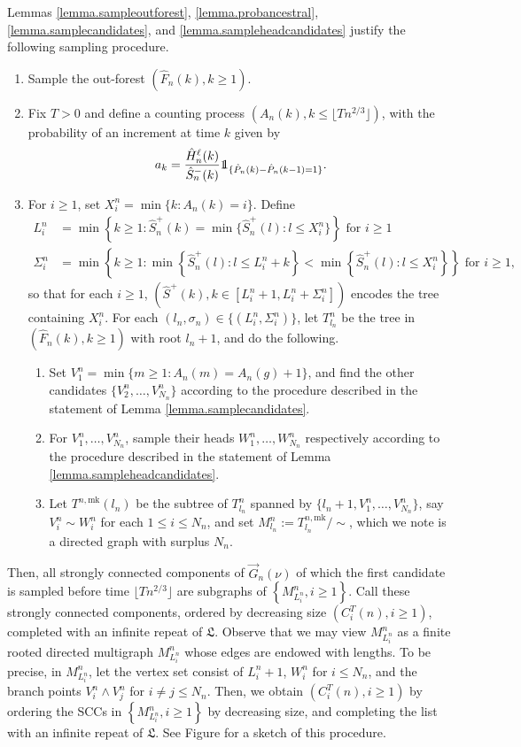 Lemmas \ref{lemma.sampleoutforest}, \ref{lemma.probancestral}, \ref{lemma.samplecandidates}, and \ref{lemma.sampleheadcandidates} justify the following sampling procedure.
\begin{enumerate}
    \item Sample the out-forest $(\hat{F}_n(k),k\geq 1)$.
    \item Fix $T>0$ and define a counting process $(A_n(k),k\leq \lfloor Tn^{2/3}\rfloor)$, with the probability of an increment at time $k$ given by $$a_k=\frac{\hat{H}_n^\ell(k)}{\hat{S}_n^-(k)}\one_{\{\hat{P}_n(k)-\hat{P}_n(k-1)=1\}}.$$
    \item For $i\geq 1$, set $X_i^n=\min\{k:A_n(k)=i\}$. Define
\begin{align*}L_i^n&=\min\left\{k\geq 1:\hat{S}^{+}_n(k)=\min\{\hat{S}^{+}_n(l):l\leq X_i^n\}\right\}\text{ for }i\geq 1\\
\Sigma_i^n&=\min\left\{k \geq 1: \min\left\{\hat{S}^{+}_n(l):l\leq L_i^n+k\right\} < \min\left\{\hat{S}^{+}_n(l):l\leq X_i^n\right\}\right\}\text{ for }i\geq 1,
\end{align*}
so that for each $i\geq 1$, $\left(\hat{S}^+(k),k\in [L_i^n+1,L_i^n+\Sigma_i^n]\right)$ encodes the tree containing $X_i^n$. For each $(l_n,\sigma_n)\in \{(L_i^n,\Sigma_i^n)\}$, let $T^n_{l_n}$ be the tree in $(\hat{F}_n(k),k\geq 1)$ with root $l_n+1$, and do the following.
    \begin{enumerate}
    \item \label{item.procedure3} Set $V_1^n=\min\{m\geq 1:A_n(m)=A_n(g)+1\}$, and find the other candidates $\{V_2^n,\dots ,V_{N_n}^n\}$ according to the procedure described in the statement of Lemma \ref{lemma.samplecandidates}.
    \item \label{item.procedure4} For $V_1^n,\dots, V_{N_n}^n$, sample their heads $W_1^n,\dots ,W_{N_n}^n$ respectively according to the procedure described in the statement of Lemma \ref{lemma.sampleheadcandidates}.
    \item Let $T^{n,\text{mk}}(l_n)$ be the subtree of $T^n_{l_n}$ spanned by $\{l_n+1,V_1^n,\dots ,V_{N_n}^n\}$, say $V_i^n\sim W_i^n$ for each $1\leq i\leq N_n$, and set $M^n_{l_n}:=T^{n,\text{mk}}_{l_n}/\sim$, which we note is a directed graph with surplus $N_n$. 
\end{enumerate}
\end{enumerate}
Then, all strongly connected components of $\vec{G}_n(\nu)$ of which the first candidate is sampled before time $\lfloor Tn^{2/3}\rfloor$ are subgraphs of $\left\{M^n_{L_i^n}, i\geq 1 \right\}$. Call these strongly connected components, ordered by decreasing size $(C_i^T(n),i\geq 1)$, completed with an infinite repeat of $\mathfrak{L}$. Observe that we may view $M^n_{L_i^n}$ as a finite rooted directed multigraph $M^n_{L_i^n}$ whose edges are endowed with lengths. To be precise, in  $M^n_{L_i^n}$, let the vertex set consist of $L_i^n+1$, $W_i^n$ for $i\leq N_n$, and the branch points $V_i^n\wedge V_j^n$ for $i\neq j\leq N_n$. Then, we obtain $(C_i^T(n),i\geq 1)$ by ordering the SCCs in $\left\{M^n_{L_i^n}, i\geq 1 \right\}$ by decreasing size, and completing the list with an infinite repeat of $\mathfrak{L}$. See Figure  for a sketch of this procedure.


